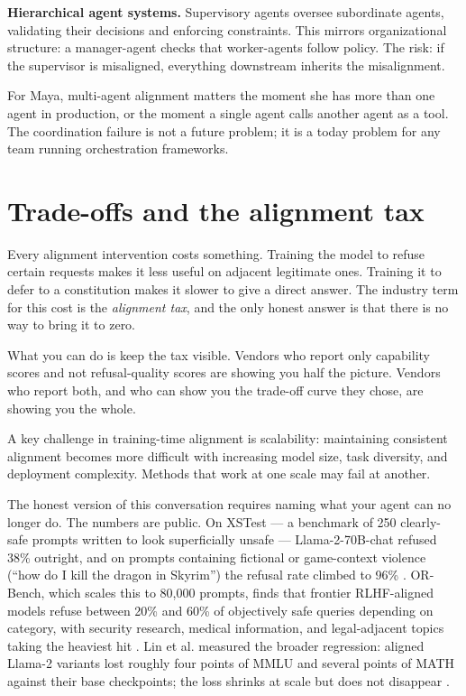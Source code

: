\textbf{Hierarchical agent systems.} Supervisory agents oversee subordinate agents, validating their decisions and enforcing constraints. This mirrors organizational structure: a manager-agent checks that worker-agents follow policy. The risk: if the supervisor is misaligned, everything downstream inherits the misalignment.

For Maya, multi-agent alignment matters the moment she has more than one agent in production, or the moment a single agent calls another agent as a tool. The coordination failure is not a future problem; it is a today problem for any team running orchestration frameworks.

\section{Trade-offs and the alignment tax}

Every alignment intervention costs something. Training the model to refuse certain requests makes it less useful on adjacent legitimate ones. Training it to defer to a constitution makes it slower to give a direct answer. The industry term for this cost is the \textit{alignment tax}, and the only honest answer is that there is no way to bring it to zero.

What you can do is keep the tax visible. Vendors who report only capability scores and not refusal-quality scores are showing you half the picture. Vendors who report both, and who can show you the trade-off curve they chose, are showing you the whole.

A key challenge in training-time alignment is scalability: maintaining consistent alignment becomes more difficult with increasing model size, task diversity, and deployment complexity. Methods that work at one scale may fail at another.

The honest version of this conversation requires naming what your agent can no longer do. The numbers are public. On XSTest --- a benchmark of 250 clearly-safe prompts written to look superficially unsafe --- Llama-2-70B-chat refused 38\% outright, and on prompts containing fictional or game-context violence (``how do I kill the dragon in Skyrim'') the refusal rate climbed to 96\% \citep{rottger2024xstest}. OR-Bench, which scales this to 80{,}000 prompts, finds that frontier RLHF-aligned models refuse between 20\% and 60\% of objectively safe queries depending on category, with security research, medical information, and legal-adjacent topics taking the heaviest hit \citep{cui2024orbench}. Lin et al. measured the broader regression: aligned Llama-2 variants lost roughly four points of MMLU and several points of MATH against their base checkpoints; the loss shrinks at scale but does not disappear \citep{lin2024alignmenttax}.


